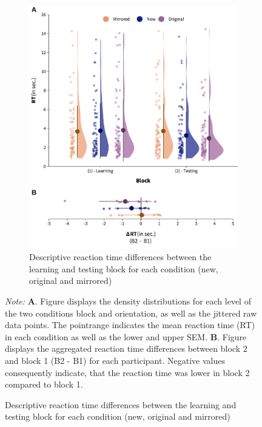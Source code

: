 \documentclass[
  man,floatsintext]{apa7}
\begin{document}
\begin{figure}[H]

\begin{figure}

\caption{Descriptive reaction time differences between the learning and testing block for each condition (new, original and mirrored)
\label{fig:rt-diff}}

{\centering \includegraphics[width=0.7\linewidth]{../results/figures/combined_rt_diff} 

}

\end{figure}


\begingroup
\footnotesize
\textit{Note:} \textbf{A}. Figure displays the density distributions for each level of the two conditions block and orientation, as well as the jittered raw data points. The pointrange indicates the mean reaction time (RT) in each condition as well as the lower and upper SEM. \textbf{B}. Figure displays the aggregated reaction time differences between block 2 and block 1 (B2 - B1) for each participant. Negative values consequently indicate, that the reaction time was lower in block 2 compared to block 1.
\endgroup
\end{figure}
\end{document}
